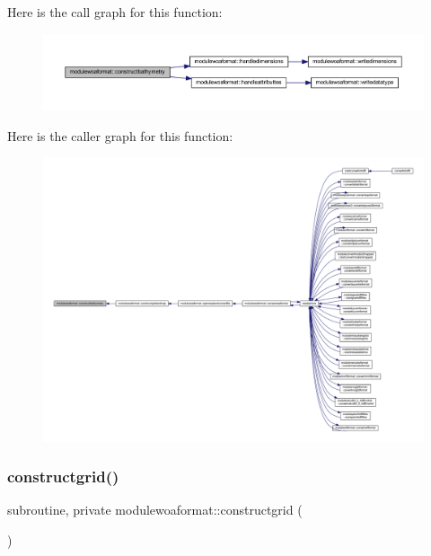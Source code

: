 Here is the call graph for this function\+:\nopagebreak
\begin{figure}[H]
\begin{center}
\leavevmode
\includegraphics[width=350pt]{namespacemodulewoaformat_add300745a920cfd269052d32ca0ccfc7_cgraph}
\end{center}
\end{figure}
Here is the caller graph for this function\+:\nopagebreak
\begin{figure}[H]
\begin{center}
\leavevmode
\includegraphics[width=350pt]{namespacemodulewoaformat_add300745a920cfd269052d32ca0ccfc7_icgraph}
\end{center}
\end{figure}
\mbox{\label{namespacemodulewoaformat_a2b1ae956746e53538872b16c62bcf308}} 
\subsubsection{\texorpdfstring{constructgrid()}{constructgrid()}}
{\footnotesize\ttfamily subroutine, private modulewoaformat\+::constructgrid (\begin{DoxyParamCaption}{ }\end{DoxyParamCaption})\hspace{0.3cm}{\ttfamily [private]}}

